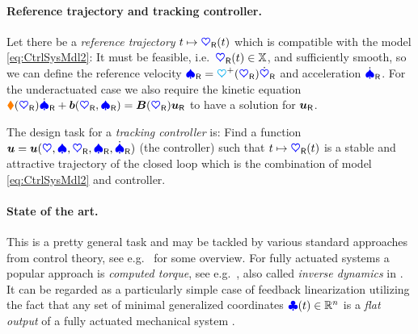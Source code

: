 
\paragraph{Reference trajectory and tracking controller.}
Let there be a \textit{reference trajectory} $t\mapsto\sysCoordR(t)$ which is compatible with the model \eqref{eq:CtrlSysMdl2}:
It must be feasible, i.e.\ $\sysCoordR(t)\in\configSpace$, and sufficiently smooth, so we can define the reference velocity $\sysVelR = \kinMat^+(\sysCoordR) \sysCoordRd$ and acceleration $\sysVelRd$.
For the underactuated case we also require the kinetic equation $\sysInertiaMat(\sysCoordR) \sysVelRd + \sysForce(\sysCoordR,\sysVelR) = \sysInputMat(\sysCoordR)\sysInputR$ to have a solution for $\sysInputR$.

The design task for a \textit{tracking controller} is: 
Find a function $\sysInput = \sysInput(\sysCoord, \sysVel, \sysCoordR, \sysVelR, \sysVelRd)$ (the controller) such that $t \mapsto \sysCoordR(t)$ is a stable and attractive trajectory of the closed loop which is the combination of model \eqref{eq:CtrlSysMdl2} and controller.

\paragraph{State of the art.}
This is a pretty general task and may be tackled by various standard approaches from control theory, see e.g.\ \cite[chap.\,7-10]{Spong:RobotModelingAndControl} for some overview.
For fully actuated systems a popular approach is \textit{computed torque}, see e.g.\ \cite[sec.\,4.5.2]{Murray:Robotic}, also called \textit{inverse dynamics} in \cite[sec.\,8.3]{Spong:RobotModelingAndControl}.
It can be regarded as a particularly simple case of feedback linearization utilizing the fact that any set of minimal generalized coordinates $\genCoord(t)\in\RealNum^{\dimConfigSpace}$ is a \textit{flat output} of a fully actuated mechanical system \cite[sec.\,7.1]{Martin:FlatSystems}.


